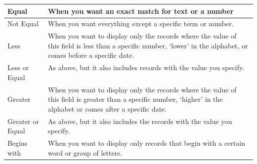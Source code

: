 \documentclass{ctrlo-int-toc}
\begin{document}
\begin{enumerate}
\begin{flushleft}
\tablefirsthead{}
\tablehead{}
\tabletail{}
\tablelasttail{}
\begin{supertabular}{|m{3.046cm}|m{10.915cm}|}
\hline
Equal &
When you want an exact match for text or a number\\\hline
Not Equal &
When you want everything except a specific term or number.\\\hline
Less &
When you want to display only the records where the value of this field is less than a specific number, `lower' in the alphabet, or comes before a specific date. \ \\\hline
Less or Equal &
As above, but it also includes records with the value you specify. \ \\\hline
Greater  &
When you want to display only the records where the value of this field is greater than a specific number, `higher' in the alphabet or comes after a specific date. \ \\\hline
Greater or Equal &
As above, but it also includes the records with the value you specify. \ \\\hline
Begins with &
When you want to display only records that begin with a certain word or group of letters.\\\hline
\end{supertabular}
\end{flushleft}
\end{enumerate}
\end{document}
